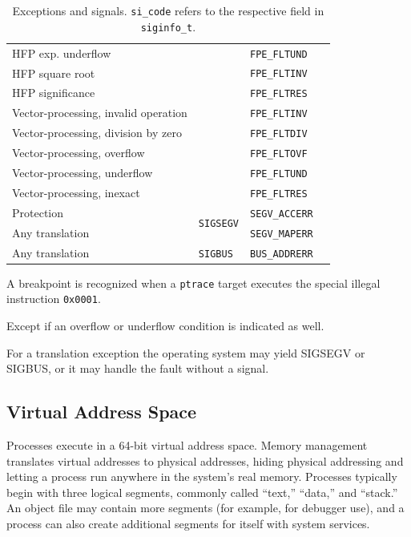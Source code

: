 \documentclass[USenglish,fontsize=11pt,twoside,%
  toc=bib,toc=idx,toc=graduated,numbers=noendperiod,
  bookmarks=true,
  bookmarksnumbered=true,
  bookmarksopen=true,
  bookmarksopenlevel=1,
  breaklinks=true,
  colorlinks=true,
  linkcolor=black,
  pdfpagelayout={TwoPageRight},
  pdfusetitle=true
]{scrreprt}
\newcommand{\ADDRBITS}{64}
\newcommand{\ADDRBITS}{31}
\newenvironment{DIFnomarkup}{}{} %
\begin{document}
\begin{table}
\begin{DIFnomarkup}
\begin{threeparttable}
\begin{tabular}{llll}
      HFP exp\@. underflow & & \texttt{FPE\_FLTUND} \\
      HFP square root & & \texttt{FPE\_FLTINV} \\
      HFP significance & & \texttt{FPE\_FLTRES} \\
      Vector-processing, invalid operation & & \texttt{FPE\_FLTINV} \\
      Vector-processing, division by zero & & \texttt{FPE\_FLTDIV} \\
      Vector-processing, overflow & & \texttt{FPE\_FLTOVF} \\
      Vector-processing, underflow & & \texttt{FPE\_FLTUND} \\
      Vector-processing, inexact & & \texttt{FPE\_FLTRES} \\
      \midrule
      Protection
      & \multirow{2}{*}{\texttt{SIGSEGV}} & \texttt{SEGV\_ACCERR} \\
      Any translation\tnote{*} & & \texttt{SEGV\_MAPERR} \\
      \midrule
      Any translation\tnote{*} & \texttt{SIGBUS} & \texttt{BUS\_ADDRERR} \\
      \bottomrule
    \end{tabular}
    \medskip
    \begin{tablenotes}
    \item [\dagger] A breakpoint is recognized when a
      \texttt{ptrace} target executes the special illegal instruction
      \texttt{0x0001}.
    \item [\ddagger] Except if an overflow or underflow condition is
      indicated as well.
    \item [*] For a translation exception the operating system may yield
      SIGSEGV or SIGBUS, or it may handle the fault without a signal.
    \end{tablenotes}
  \end{threeparttable}
  \end{DIFnomarkup}
  \caption[Exceptions and signals]{Exceptions and signals.
    \texttt{si\_code} refers to the respective field in
    \texttt{siginfo\_t}.}
  \label{tab:exceptions}
\end{table}

\subsection{Virtual Address Space}
Processes execute in a \ADDRBITS{}-bit virtual address
space.  Memory management translates virtual addresses to physical
addresses, hiding physical addressing and letting a process run
anywhere in the system's real memory.  Processes typically begin with
three logical segments, commonly called ``text,'' ``data,'' and
``stack.''  An object file may contain more segments (for example, for
debugger use), and a process can also create additional segments for
itself with system services.
\end{document}
